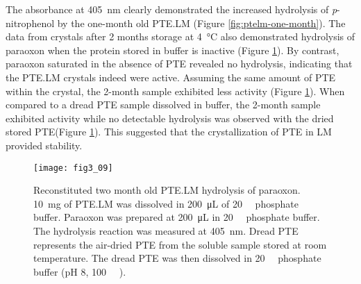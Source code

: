 \begin{refsection}
The absorbance at \SI{405}{\nm} clearly demonstrated the
increased hydrolysis of \emph{p}-nitrophenol by the one-month old PTE.LM
(Figure \ref{fig:ptelm-one-month}). The data from crystals after 2 months
storage at \SI{4}{\celsius} also demonstrated hydrolysis of paraoxon when the
protein stored in buffer is inactive (Figure \ref{fig:ptelm-two-month}). By
contrast, paraoxon saturated in the absence of PTE revealed no hydrolysis,
indicating that the PTE.LM crystals indeed were active. Assuming the same
amount of PTE within the crystal, the 2-month sample exhibited less activity
(Figure \ref{fig:ptelm-two-month}). When compared to a dread PTE sample
dissolved in buffer, the 2-month sample exhibited activity while no detectable
hydrolysis was observed with the dried stored PTE(Figure
\ref{fig:ptelm-two-month}). This suggested that the crystallization of PTE in
LM provided stability.
\begin{figure}[htbp] \centering \texttt{[image: fig3\_09]}
    \caption[Reconstituted two month old PTE.LM hydrolysis of paraoxon.
        \SI{10}{\mg} of PTE.LM was dissolved in \SI{200}{\micro\liter} of
        \SI{20}{\milli\Molar} phosphate buffer. Paraoxon was prepared at
        \SI{200}{\micro\liter} in \SI{20}{\milli\Molar} phosphate buffer. The
        hydrolysis reaction was measured at \SI{405}{\nm}. Dread PTE represents
        the air-dried PTE that was stored at room temperature and dissolved in
        \SI{20}{\milli\Molar} phosphate buffer (pH 8, \SI{100}{\micro\Molar}
    ).] {Reconstituted two month old PTE.LM hydrolysis of paraoxon.
        \SI{10}{\mg} of PTE.LM was dissolved in \SI{200}{\micro\liter} of
        \SI{20}{\milli\Molar} phosphate buffer. Paraoxon was prepared at
        \SI{200}{\micro\liter} in \SI{20}{\milli\Molar} phosphate buffer. The
        hydrolysis reaction was measured at \SI{405}{\nm}.  Dread PTE
        represents the air-dried PTE from the soluble sample stored at room
        temperature. The dread PTE was then dissolved in \SI{20}{\milli\Molar}
        phosphate buffer (pH 8, \SI{100}{\micro\Molar} ).}
    \label{fig:ptelm-two-month} 
\end{figure}


\end{refsection}
